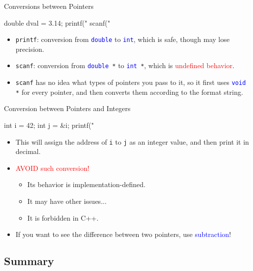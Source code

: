 \documentclass{beamer}
\newcommand{\red}[1]{\textcolor{red}{#1}}
\newcommand{\blue}[1]{\textcolor{blue}{#1}}
\newcommand{\ttt}[1]{\texttt{#1}}
\newcommand{\bluett}[1]{\blue{\ttt{#1}}}
\theoremstyle{definition}
\begin{document}
\begin{frame}[fragile]{Conversions between Pointers}
    \begin{cpp}
double dval = 3.14;
printf("%
scanf("%
    \end{cpp}
    \pause
    \begin{itemize}
        \item \ttt{printf}: conversion from \bluett{double} to \bluett{int}, which is safe, though may lose precision.
        \item \ttt{scanf}: conversion from \bluett{double }\ttt{*} to \bluett{int }\ttt{*}, which is \red{undefined behavior}.
        \pause
        \item \ttt{scanf} has no idea what types of pointers you pass to it, so it first uses \bluett{void }\ttt{*} for every pointer, and then converts them according to the format string.
    \end{itemize}
\end{frame}

\begin{frame}[fragile]{Conversion between Pointers and Integers}
    \begin{cpp}
int i = 42;
int j = &i;
printf("%
    \end{cpp}
    \begin{itemize}
        \item This will assign the address of \ttt{i} to \ttt{j} as an integer value, and then print it in decimal.
        \pause
        \item \red{AVOID such conversion!}
        \begin{itemize}
            \item Its behavior is implementation-defined.
            \item It may have other issues...
            \item It is forbidden in C++.
        \end{itemize}
        \pause
        \item If you want to see the difference between two pointers, use \blue{subtraction}!
    \end{itemize}
\end{frame}

\subsection{Summary}
\end{document}
